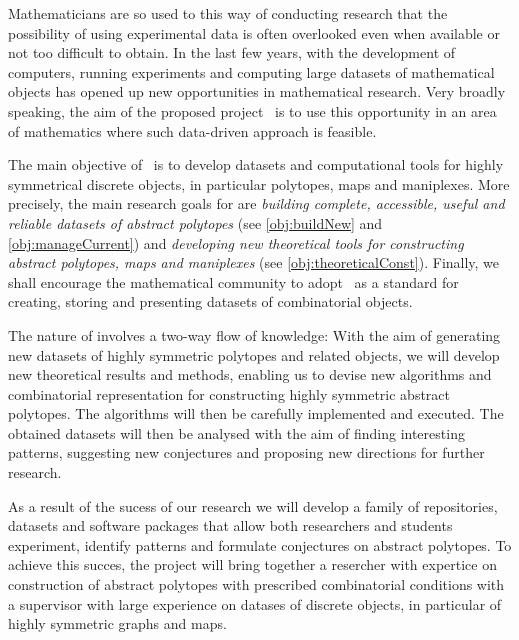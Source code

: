 Mathematicians are so used to this way of conducting research that the possibility of using experimental data is often overlooked even when available or not too difficult to obtain.
In the last few years, with the development of computers, running experiments and computing large datasets of mathematical objects has opened up new opportunities in mathematical research.
Very broadly speaking, the aim of the proposed project \ourp\ is to use this opportunity in an area of mathematics where such data-driven approach is feasible.



The  main objective of \ourp\ is to develop datasets and computational tools for highly symmetrical discrete objects, in particular polytopes, maps and maniplexes.
More precisely, the main research goals for \ourp are \emph{building complete, accessible, useful and reliable datasets of abstract polytopes} (see \cref{obj:buildNew} and \cref{obj:manageCurrent}) and \emph{developing new theoretical tools for constructing abstract polytopes, maps and maniplexes} (see \cref{obj:theoreticalConst}).
Finally, we shall encourage the mathematical community to adopt \ourp\ as a standard for creating, storing and presenting datasets of combinatorial objects.

The nature of \ourp involves a two-way flow of knowledge:
With the aim of generating new datasets of highly symmetric polytopes and related objects, we will develop new theoretical results and methods, enabling us to devise new algorithms and combinatorial representation for constructing highly symmetric abstract polytopes.
The algorithms will then be carefully implemented and executed.
The obtained datasets will then be analysed with the aim of finding interesting patterns, suggesting new conjectures and proposing new directions for further research.

As a result of the sucess of our research we will develop a family of repositories, datasets and software packages that allow both researchers and students experiment, identify patterns and formulate conjectures on abstract polytopes.
To achieve this succes, the project will bring together a resercher with expertice on construction of abstract polytopes with prescribed combinatorial conditions with a supervisor with large experience on datases of discrete objects, in particular of highly symmetric graphs and maps.

